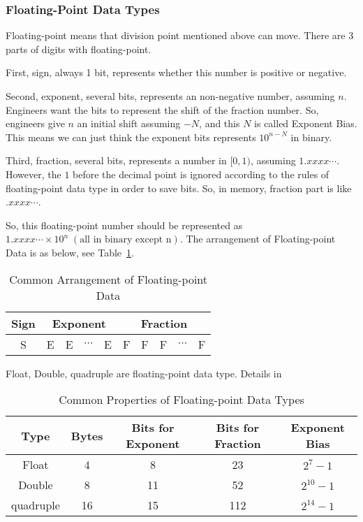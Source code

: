 \documentclass{article}
\begin{document}
\subsubsection{Floating-Point Data Types}
Floating-point means that division point mentioned above can move. There are 3 parts of digits with floating-point. 

First, sign, always 1 bit, represents whether this number is positive or negative. 

Second, exponent, several bits, represents an non-negative number, assuming $n$. Engineers want the bits to represent the shift of the fraction number. So, engineers give $n$ an initial shift assuming $-N$, and this $N$ is called Exponent Bias. This means we can just think the exponent bits represents $10^{n - N}$ in binary.

Third, fraction, several bits, represents a number in $[0, 1)$, assuming $1.xxxx\cdots$. However, the $1$ before the decimal point is ignored according to the rules of floating-point data type in order to save bits. So, in memory, fraction part is like $.xxxx\cdots$.

So, this floating-point number should be represented as $1.xxxx\cdots \times 10^n \; (\text{all in binary except n})$. 
The arrangement of Floating-point Data is as below, see Table~\ref{tab:floating-point-arrangement}.

\begin{table}[!ht]
    \centering
    \begin{tabular}{|c|c|c|c|c|c|c|c|c|c|}
    \hline
        Sign & \multicolumn{4}{|c}{Exponent}  & \multicolumn{5}{|c|}{Fraction} \\ \hline
        S & E & E & $\cdots$ & E & F & F & F & $\cdots$ & F \\ \hline
    \end{tabular}
    \caption{Common Arrangement of Floating-point Data}
    \label{tab:floating-point-arrangement}
\end{table}

Float, Double, quadruple are floating-point data type. Details in

\begin{table}[!ht]
    \centering
    \begin{tabular}{|c|c|c|c|c|}
    \hline
        Type & Bytes & Bits for Exponent & Bits for Fraction & Exponent Bias  \\ \hline
        Float & 4 & 8 & 23 & $2^7 - 1$   \\ \hline
        Double & 8 & 11 & 52 & $2^{10} - 1$  \\ \hline
        quadruple & 16 & 15 & 112 & $2^{14} - 1 $  \\ \hline
    \end{tabular}
    \caption{Common Properties of Floating-point Data Types}
    \label{tab:floating-point}
\end{table}
\end{document}
